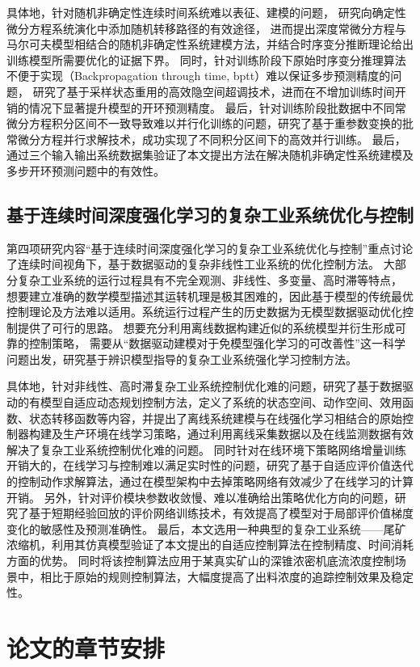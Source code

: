 具体地，针对随机非确定性连续时间系统难以表征、建模的问题，
研究向确定性微分方程系统演化中添加随机转移路径的有效途径，
进而提出深度常微分方程与马尔可夫模型相结合的随机非确定性系统建模方法，并结合时序变分推断理论给出训练模型所需要优化的证据下界。
同时，针对训练阶段下原始时序变分推理算法不便于实现（Backpropagation through time, bptt）难以保证多步预测精度的问题，
研究了基于采样状态重用的高效隐空间超调技术，进而在不增加训练时间开销的情况下显著提升模型的开环预测精度。
最后，针对训练阶段批数据中不同常微分方程积分区间不一致导致难以并行化训练的问题，研究了基于重参数变换的批常微分方程并行求解技术，成功实现了不同积分区间下的高效并行训练。
最后，通过三个输入输出系统数据集验证了本文提出方法在解决随机非确定性系统建模及多步开环预测问题中的有效性。
\subsection{基于连续时间深度强化学习的复杂工业系统优化与控制}
第四项研究内容“基于连续时间深度强化学习的复杂工业系统优化与控制”重点讨论了连续时间视角下，基于数据驱动的复杂非线性工业系统的优化控制方法。
大部分复杂工业系统的运行过程具有不完全观测、非线性、多变量、高时滞等特点，
想要建立准确的数学模型描述其运转机理是极其困难的，因此基于模型的传统最优控制理论及方法难以适用。系统运行过程产生的历史数据为无模型数据驱动优化控制提供了可行的思路。
想要充分利用离线数据构建近似的系统模型并衍生形成可靠的控制策略，
需要从“数据驱动建模对于免模型强化学习的可改善性”这一科学问题出发，研究基于辨识模型指导的复杂工业系统强化学习控制方法。

具体地，针对非线性、高时滞复杂工业系统控制优化难的问题，研究了基于数据驱动的有模型自适应动态规划控制方法，定义了系统的状态空间、动作空间、效用函数、状态转移函数等内容，并提出了离线系统建模与在线强化学习相结合的原始控制器构建及生产环境在线学习策略，通过利用离线采集数据以及在线监测数据有效解决了复杂工业系统控制优化难的问题。
同时针对在线环境下策略网络增量训练开销大的，在线学习与控制难以满足实时性的问题，研究了基于自适应评价值迭代的控制动作求解算法，通过在模型架构中去掉策略网络有效减少了在线学习的计算开销。
另外，针对评价模块参数收敛慢、难以准确给出策略优化方向的问题，研究了基于短期经验回放的评价网络训练技术，有效提高了模型对于局部评价值梯度变化的敏感性及预测准确性。
最后，本文选用一种典型的复杂工业系统——尾矿浓缩机，利用其仿真模型验证了本文提出的自适应控制算法在控制精度、时间消耗方面的优势。
同时将该控制算法应用于某真实矿山的深锥浓密机底流浓度控制场景中，相比于原始的规则控制算法，大幅度提高了出料浓度的追踪控制效果及稳定性。

\section{论文的章节安排}

